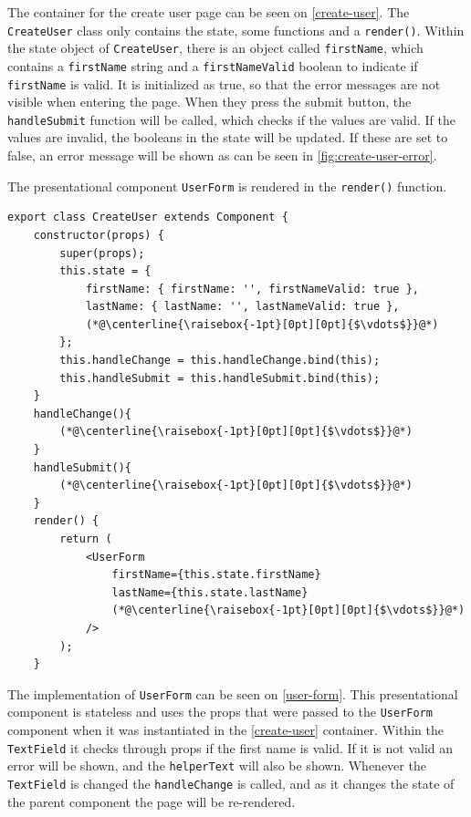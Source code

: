 The container for the create user page can be seen on \autoref{create-user}.
The \texttt{CreateUser} class only contains the state, some functions and a \texttt{render()}.
Within the state object of \texttt{CreateUser}, there is an object called \texttt{firstName}, which contains a \texttt{firstName} string and a \texttt{firstNameValid} boolean to indicate if \texttt{firstName} is valid.
It is initialized as true, so that the error messages are not visible when entering the page.
When they press the submit button, the \texttt{handleSubmit} function will be called, which checks if the values are valid.
If the values are invalid, the booleans in the state will be updated. 
If these are set to false, an error message will be shown as can be seen in \autoref{fig:create-user-error}.

The presentational component \texttt{UserForm} is rendered in the \texttt{render()} function. 
\begin{lstlisting}[caption={Component to create user}, captionpos=b, label={create-user}]
export class CreateUser extends Component {
    constructor(props) {
        super(props);
        this.state = {
            firstName: { firstName: '', firstNameValid: true },
            lastName: { lastName: '', lastNameValid: true },
            (*@\centerline{\raisebox{-1pt}[0pt][0pt]{$\vdots$}}@*)
        };
        this.handleChange = this.handleChange.bind(this);
        this.handleSubmit = this.handleSubmit.bind(this);
    }
    handleChange(){
        (*@\centerline{\raisebox{-1pt}[0pt][0pt]{$\vdots$}}@*)
    }
    handleSubmit(){
        (*@\centerline{\raisebox{-1pt}[0pt][0pt]{$\vdots$}}@*)
    }
    render() {
        return (
            <UserForm
                firstName={this.state.firstName}
                lastName={this.state.lastName}
                (*@\centerline{\raisebox{-1pt}[0pt][0pt]{$\vdots$}}@*)
            />
        );
    }
\end{lstlisting}

The implementation of \texttt{UserForm} can be seen on \autoref{user-form}.
This presentational component is stateless and uses the props that were passed to the \texttt{UserForm} component when it was instantiated in the \autoref{create-user} container.
Within the \texttt{TextField} it checks through props if the first name is valid. 
If it is not valid an error will be shown, and the \texttt{helperText} will also be shown.
Whenever the \texttt{TextField} is changed the \texttt{handleChange} is called, and as it changes the state of the parent component the page will be re-rendered.

